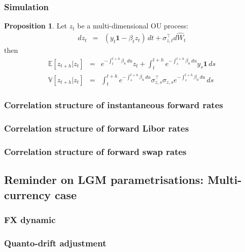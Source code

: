 \documentclass[11pt,english]{amsart}
\newcommand{\vun}{\mathbf{1}}
\newcommand{\EE}{\mathbb{E}}
\newcommand{\VV}{\mathbb{V}}
\theoremstyle{definition}
\newtheorem{prop}{Proposition}
\begin{document}
\subsubsection{Simulation}%


\begin{prop}
Let $z_t$ be a multi-dimensional OU process:
\begin{eqnarray}
  dz_t &=& \left(y_t\vun - \beta_{t}z_t\right)\,dt + \sigma_{z,t}^\top  d\widehat{W}_t 
\end{eqnarray}
then 
\begin{eqnarray}
  \EE[z_{t+h} | z_t ] &=& e^{-\int_t^{t+h} \beta_u \, du}z_t + \int_t^{t+h}  e^{-\int_s^{t+h} \beta_u \, du}y_s \vun \, ds  \\
  \VV[z_{t+h} | z_t ] &=&  \int_t^{t+h} e^{-\int_s^{t+h} \beta_u \, du} \sigma_{z,s}^\top \sigma_{z,s}  e^{-\int_s^{t+h} \beta_u \, du} \,  ds  
\end{eqnarray}
\end{prop}


\subsubsection{Correlation structure of instantaneous forward rates}%



\subsubsection{Correlation structure of forward Libor rates}%



\subsubsection{Correlation structure of forward swap rates}%



\subsection{Reminder on LGM parametrisations: Multi-currency case}%


\subsubsection{FX dynamic}%


\subsubsection{Quanto-drift adjustment}%
\end{document}
